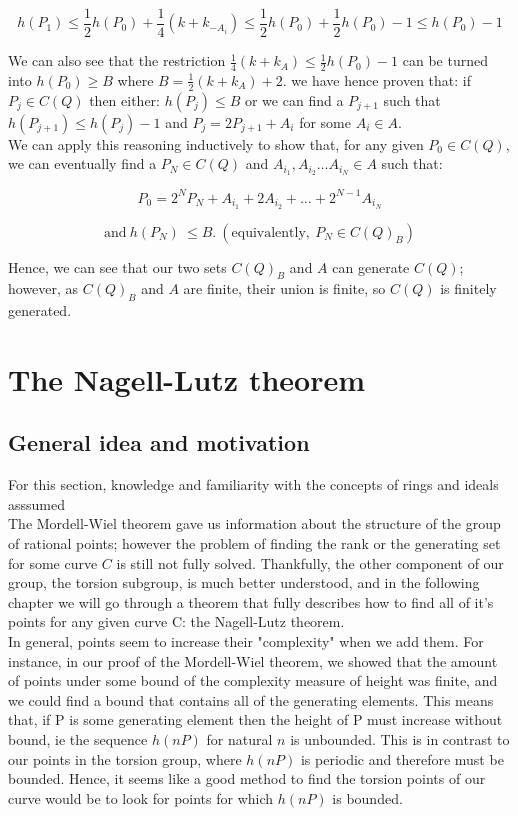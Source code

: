 \documentclass{article}
\begin{document}
\[ h(P_1) \leq \frac{1}{2}h(P_0) + \frac{1}{4} (k + k_{-A_i}) \leq \frac{1}{2}h(P_0) + \frac{1}{2}h(P_0) - 1 \leq h(P_0) - 1 \]

We can also see that the restriction $\frac{1}{4}(k + k_A) \leq \frac{1}{2}h(P_0) - 1$ can be turned into $h(P_0) \geq B$ where $B = \frac{1}{2}(k + k_A) + 2$. we have hence proven that: if $P_j \in C(Q)$ then either: $h(P_j) \leq B$ or we can find a $P_{j + 1}$ such that $h(P_{j + 1}) \leq h(P_j) - 1$ and $P_j = 2P_{j+1} + A_i$ for some $A_i \in A$.\\

We can apply this reasoning inductively to show that, for any given $P_0 \in C(Q)$, we can eventually find a $P_N \in C(Q)$ and $A_{i_1}, A_{i_2} \dots A_{i_N} \in A$ such that:

\[ P_0 = 2^N P_N + A_{i_1} + 2 A_{i_2} + \dots + 2^{N-1}A_{i_N} \]

\[ \text{and} \ h(P_N) \ \leq B. \ (\text{equivalently}, \ P_N \in C(Q)_B) \]

Hence, we can see that our two sets $C(Q)_B$ and $A$ can generate $C(Q)$; however, as $C(Q)_B$ and $A$ are finite, their union is finite, so $C(Q)$ is finitely generated.


\newpage

\section{The Nagell-Lutz theorem}

\subsection{General idea and motivation}

For this section, knowledge and familiarity with the concepts of rings and ideals asssumed\\

The Mordell-Wiel theorem gave us information about the structure of the group of rational points; however the problem of finding the rank or the generating set for some curve $C$ is still not fully solved. Thankfully, the other component of our group, the torsion subgroup, is much better understood, and in the following chapter we will go through a theorem that fully describes how to find all of it's points for any given curve C: the Nagell-Lutz theorem.\\

In general, points seem to increase their "complexity" when we add them. For instance, in our proof of the Mordell-Wiel theorem, we showed that the amount of points under some bound of the complexity measure of height was finite, and we could find a bound that contains all of the generating elements. This means that, if P is some generating element then the height of P must increase without bound, ie the sequence $h(nP)$ for natural $n$ is unbounded. This is in contrast to our points in the torsion group, where $h(nP)$ is periodic and therefore must be bounded. Hence, it seems like a good method to find the torsion points of our curve would be to look for points for which $h(nP)$ is bounded.\\
\end{document}
